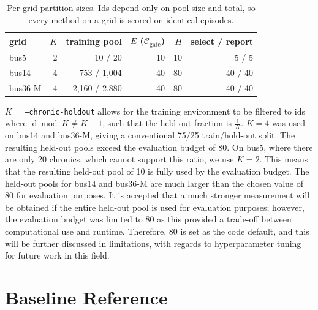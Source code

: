 \begin{table}[H]
\centering\small
\begin{tabular}{lrrrrr}
\toprule
grid & $K$ & training pool & $E$ ($\mathcal{C}_{\text{gate}}$) & $H$ & select / report \\
\midrule
bus5    & 2 &   10 / 20      & 10 & 10 & 5 / 5 \\
bus14   & 4 &  753 / 1{,}004 & 40 & 80 & 40 / 40 \\
bus36-M & 4 & 2{,}160 / 2{,}880 & 40 & 80 & 40 / 40 \\
\bottomrule
\end{tabular}
\caption{Per-grid partition sizes. Ids depend only on pool size and total, so
every method on a grid is scored on identical episodes.}
\label{tab:partition-sizes}
\end{table}


$K$ = \texttt{--chronic-holdout} allows for the training environment to be filtered to ids where $\mathrm{id} \bmod K \neq K-1$, such that the held-out fraction is $\frac{1}{K}$. $K = 4$ was used on bus14 and bus36-M, giving a conventional 75/25 train/hold-out split. The resulting held-out pools exceed the evaluation budget of 80. On bus5, where there are only 20 chronics, which cannot support this ratio, we use $K = 2$. This means that the resulting held-out pool of 10 is fully used by the evaluation budget. The held-out pools for bus14 and bus36-M are much larger than the chosen value of 80 for evaluation purposes. It is accepted that a much stronger measurement will be obtained if the entire held-out pool is used for evaluation purposes; however, the evaluation budget was limited to 80 as this provided a trade-off between computational use and runtime. Therefore, 80 is set as the code default, and this will be further discussed in limitations, with regards to hyperparameter tuning for future work in this field.

\section{Baseline Reference}

